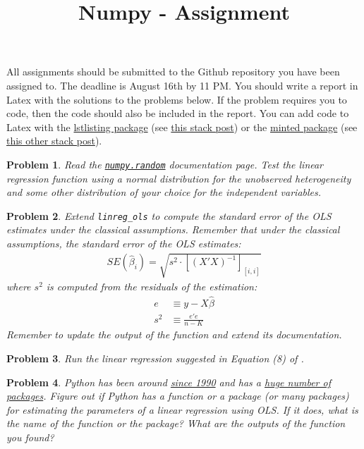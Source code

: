 \documentclass[12pt, a4paper]{article}
\date{}
\title{Numpy - Assignment}
\newtheorem{problem}{Problem}
\begin{document}
\maketitle
All assignments should be submitted to the Github repository you have been assigned to.
The deadline is August 16th by 11 PM.
You should write a report in Latex with the solutions to the problems below.
If the problem requires you to code, then the code should also be included in the report.
You can add code to Latex with the \href{http://texdoc.net/texmf-dist/doc/latex/listings/listings.pdf}{lstlisting package} (see \href{https://tex.stackexchange.com/a/83883/65818}{this stack post}) or the \href{http://tug.ctan.org/tex-archive/macros/latex/contrib/minted/minted.pdf}{minted package} (see \href{https://stackoverflow.com/a/1985330/1445572}{this other stack post}).
\begin{problem}
Read the \href{https://docs.scipy.org/doc/numpy/reference/routines.random.html}{\texttt{numpy.random}} documentation page.
Test the linear regression function using a normal distribution for the unobserved heterogeneity and some other distribution of your choice for the independent variables.
\end{problem}
\begin{problem}
Extend \texttt{linreg\_ols} to compute the standard error of the OLS estimates under the classical assumptions.
Remember that under the classical assumptions, the standard error of the OLS estimates:
\begin{align*}
SE(\hat{\beta}_i) = \sqrt{s^2\cdot[(X'X)^{-1}]_{[i, i]}}
\end{align*}
where \(s^2\) is computed from the residuals of the estimation:
\begin{align*}
e&\equiv y-X\hat{\beta}\\
s^2&\equiv\frac{e'e}{n-K}
\end{align*}
Remember to update the output of the function and extend its documentation.
\end{problem}
\begin{problem}
Run the linear regression suggested in Equation (8) of \citet{PB1997}.
\end{problem}
\begin{problem}
Python has been around \href{https://en.wikipedia.org/wiki/Python\_(programming\_language)}{since 1990} and has a \href{https://pypi.org}{huge number of packages}.
Figure out if Python has a function or a package (or many packages) for estimating the parameters of a linear regression using OLS.
If it does, what is the name of the function or the package?
What are the outputs of the function you found?
\end{problem}
\end{document}
